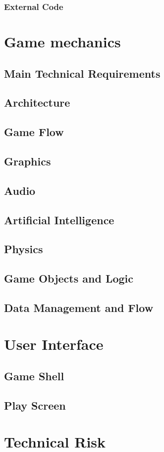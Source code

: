 \documentclass{article}
\begin{document}
\subsubsection{External Code}

\section{Game mechanics}

\subsection{Main Technical Requirements}

\subsection{Architecture}

\subsection{Game Flow}

\subsection{Graphics}

\subsection{Audio}

\subsection{Artificial Intelligence}

\subsection{Physics}

\subsection{Game Objects and Logic}

\subsection{Data Management and Flow}

\section{User Interface}

\subsection{Game Shell}

\subsection{Play Screen}

\section{Technical Risk}
\end{document}
